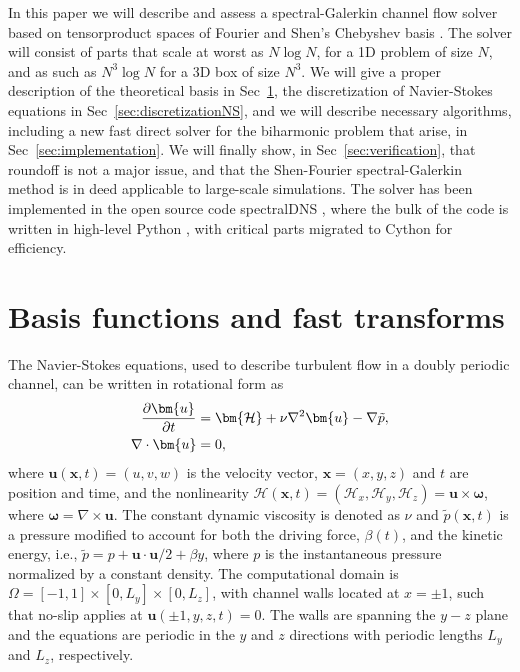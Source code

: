 \documentclass[preprint]{elsarticle}
\begin{document}
In this paper we will describe and assess a spectral-Galerkin channel flow solver based on tensorproduct spaces of Fourier and Shen's Chebyshev basis \cite{Shen95}. The solver will consist of parts that scale at worst as $N \log N$, for a 1D problem of size $N$, and as such as $N^3 \log N$ for a 3D box of size $N^3$. We will give a proper description of the theoretical basis in Sec~\ref{sec:prelim}, the discretization of Navier-Stokes equations in Sec~\ref{sec:discretizationNS}, and we will describe necessary algorithms, including a new fast direct solver for the biharmonic problem that arise, in Sec~\ref{sec:implementation}. We will finally show, in Sec~\ref{sec:verification}, that roundoff is not a major issue, and that the Shen-Fourier spectral-Galerkin method is in deed applicable to large-scale simulations. The solver has been implemented in the open source code spectralDNS \cite{spectralDNS}, where the bulk of the code is written in high-level Python \cite{python}, with critical parts migrated to Cython \cite{cython} for efficiency.

\section{Basis functions and fast transforms}
\label{sec:prelim}
The Navier-Stokes equations, used to describe turbulent flow in a doubly 
periodic channel, can be written in rotational form as
\begin{align}
 \frac{\partial \bm{u}}{\partial t}   &= \bm{\mathcal{H}} + \nu 
 \nabla^2 \bm{u} - \nabla{\tilde{p}}, \notag \\
 \nabla \cdot \bm{u} &= 0, \label{eq:NS}
\end{align}
where $\bm{u}(\bm{x}, t)=(u, v, w)$ is the velocity vector, $\bm{x}=(x, y, z)$ 
and $t$ are position and time, and the nonlinearity $\bm{\mathcal{H}}(\bm{x}, t) = (\mathcal{H}_x, \mathcal{H}_y, \mathcal{H}_z) = \bm{u}\times 
\bm{\omega}$, where $\bm{\omega} = \nabla \times \bm{u}$.  The constant dynamic viscosity is denoted as $\nu$ 
and $\tilde{p}(\bm{x}, t)$ is a pressure modified to account for both the driving force, $\beta(t)$, and the kinetic energy, i.e., $\tilde{p} = p + \bm{u} \cdot \bm{u}/2 + \beta y$, where $p$ is the instantaneous 
pressure normalized by a constant density. The computational domain is 
$\Omega=[-1, 1]\times [0, L_y] \times [0, L_z]$, with channel walls 
located at $x=\pm 1$, such that no-slip applies at 
$ \bm{u}(\pm 1, y, z, t) = 0$. The walls are spanning 
the $y-z$ plane and the equations are periodic in the $y$ and $z$ directions with periodic lengths $L_y$ and $L_z$, respectively.
\end{document}
